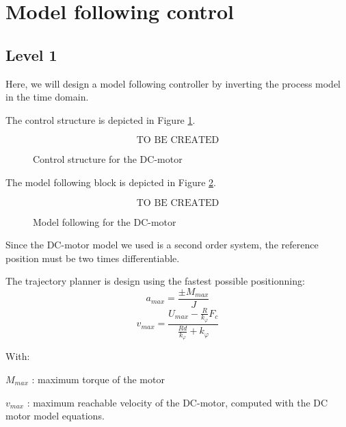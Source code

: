 \section*{Model following control}

\subsection*{Level 1}


Here, we will design a model following controller by inverting the process model in the time domain.

The control structure is depicted in Figure \ref{contStruct}.

\begin{figure}[ht]
\begin{center}
$$\text{TO BE CREATED}$$
\end{center}
 \caption{Control structure for the DC-motor}
 \label{contStruct}
\end{figure}

The model following block is depicted in Figure \ref{modelFollow}.

\begin{figure}[ht]
\begin{center}
$$\text{TO BE CREATED}$$
\end{center}
 \caption{Model following for the DC-motor}
 \label{modelFollow}
\end{figure}

Since the DC-motor model we used is a second order system, the reference position must be two times differentiable. 

The trajectory planner is design using the fastest possible positionning:
\begin{equation}a_{max} = \frac{\pm M_{max}}{J}\end{equation}
\begin{equation}v_{max} = \frac{U_{max} - \frac{R}{k_\varphi} F_c}{\frac{R d}{k_\varphi} + k_\varphi}\end{equation}

With:

$M_{max}$ : maximum torque of the motor

$v_{max}$ : maximum reachable velocity of the DC-motor, computed with the DC motor model equations.





